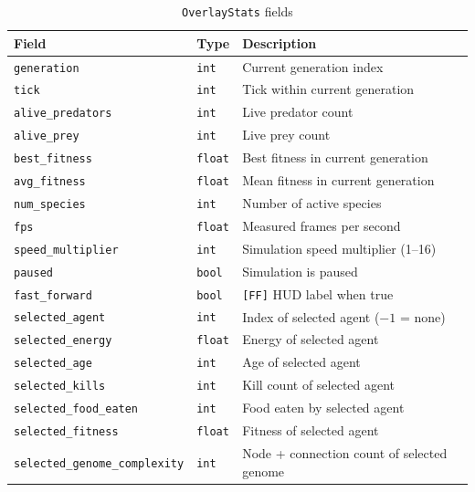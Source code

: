 \begin{table}[H]
\centering\small
\caption{\texttt{OverlayStats} fields}
\begin{tabularx}{\textwidth}{@{}llX@{}}
\toprule
\textbf{Field} & \textbf{Type} & \textbf{Description} \\
\midrule
\texttt{generation}          & \texttt{int}   & Current generation index \\
\texttt{tick}                & \texttt{int}   & Tick within current generation \\
\texttt{alive\_predators}    & \texttt{int}   & Live predator count \\
\texttt{alive\_prey}         & \texttt{int}   & Live prey count \\
\texttt{best\_fitness}       & \texttt{float} & Best fitness in current generation \\
\texttt{avg\_fitness}        & \texttt{float} & Mean fitness in current generation \\
\texttt{num\_species}        & \texttt{int}   & Number of active species \\
\texttt{fps}                 & \texttt{float} & Measured frames per second \\
\texttt{speed\_multiplier}   & \texttt{int}   & Simulation speed multiplier (1–16) \\
\texttt{paused}              & \texttt{bool}  & Simulation is paused \\
\texttt{fast\_forward}       & \texttt{bool}  & \texttt{[FF]} HUD label when true \\
\texttt{selected\_agent}     & \texttt{int}   & Index of selected agent ($-1$ = none) \\
\texttt{selected\_energy}    & \texttt{float} & Energy of selected agent \\
\texttt{selected\_age}       & \texttt{int}   & Age of selected agent \\
\texttt{selected\_kills}     & \texttt{int}   & Kill count of selected agent \\
\texttt{selected\_food\_eaten}& \texttt{int}  & Food eaten by selected agent \\
\texttt{selected\_fitness}   & \texttt{float} & Fitness of selected agent \\
\texttt{selected\_genome\_complexity} & \texttt{int} & Node + connection count of selected genome \\
\bottomrule
\end{tabularx}
\end{table}

